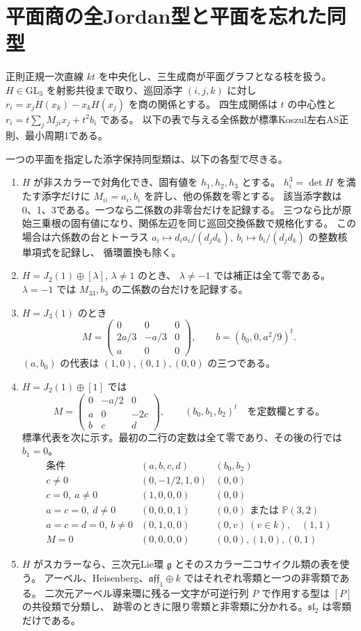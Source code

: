\section{平面商の全Jordan型と平面を忘れた同型}
\label{sec:plane-quotient-normal-forms}
正則正規一次直線 $kt$ を中央化し、三生成商が平面グラフとなる枝を扱う。
$H\in\mathrm{GL}_3$ を射影共役まで取り、巡回添字 $(i,j,k)$ に対し
$r_i=x_j H(x_k)-x_k H(x_j)$ を商の関係とする。
四生成関係は $t$ の中心性と $r_i=t\sum_j M_{ji}x_j+t^2 b_i$ である。
以下の表で与える全係数が標準Koszul左右AS正則、最小周期1である。
\begin{theorem}\label{thm:plane-quotient-all-marked}
一つの平面を指定した添字保持同型類は、以下の各型で尽きる。
\begin{enumerate}
\item $H$ が非スカラーで対角化でき、固有値を $h_1,h_2,h_3$ とする。
$h_i^3=\det H$ を満たす添字だけに $M_{ii}=a_i,b_i$ を許し、他の係数を零とする。
該当添字数は0、1、3である。一つなら二係数の非零台だけを記録する。
三つなら比が原始三乗根の固有値になり、関係左辺を同じ巡回交換係数で規格化する。
この場合は六係数の台とトーラス
$a_i\mapsto d_i a_i/(d_jd_k),\ b_i\mapsto b_i/(d_jd_k)$ の整数核単項式を記録し、
循環置換も除く。
\item $H=J_2(1)\oplus[\lambda]$, $\lambda\ne1$ のとき、
$\lambda\ne-1$ では補正は全て零である。$\lambda=-1$ では $M_{33},b_3$ の二係数の台だけを記録する。
\item $H=J_3(1)$ のとき
\[
 M=\begin{pmatrix}0&0&0\\2a/3&-a/3&0\\a&0&0\end{pmatrix},
 \qquad b=(b_0,0,a^2/9)^t .
\]
$(a,b_0)$ の代表は $(1,0),(0,1),(0,0)$ の三つである。
\item $H=J_2(1)\oplus[1]$ では
\[
 M=\begin{pmatrix}0&-a/2&0\\a&0&-2c\\b&c&d\end{pmatrix},\qquad
 (b_0,b_1,b_2)^t\quad\text{を定数欄とする。}
\]
標準代表を次に示す。最初の二行の定数は全て零であり、その後の行では $b_1=0$。
\[
\begin{array}{c|c|l}
 \text{条件}&(a,b,c,d)&(b_0,b_2)\\ \hline
 c\ne0 &(0,-1/2,1,0)&(0,0)\\
 c=0,\ a\ne0 &(1,0,0,0)&(0,0)\\
 a=c=0,\ d\ne0 &(0,0,0,1)&(0,0)\text{ または }\mathbb P(3,2)\\
 a=c=d=0,\ b\ne0 &(0,1,0,0)&(0,v)\ (v\in k),\quad(1,1)\\
 M=0 &(0,0,0,0)&(0,0),(1,0),(0,1)
\end{array}
\]
\item $H$ がスカラーなら、三次元Lie環 $\mathfrak g$ とそのスカラー二コサイクル類の表を使う。
アーベル、Heisenberg、$\mathfrak{aff}_1\oplus k$ ではそれぞれ零類と一つの非零類である。
二次元アーベル導来環に残る一文字が可逆行列 $P$ で作用する型は $[P]$ の共役類で分類し、
跡零のときに限り零類と非零類に分かれる。$\mathfrak{sl}_2$ は零類だけである。
\end{enumerate}
\end{theorem}
